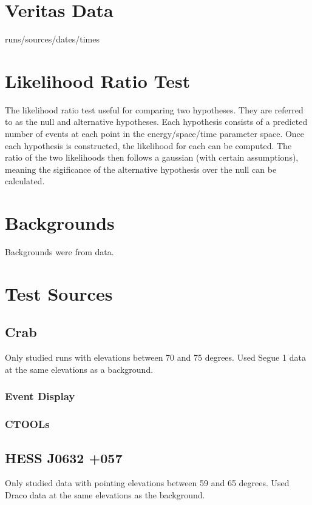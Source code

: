 \section{Veritas Data}
runs/sources/dates/times

\section{Likelihood Ratio Test}
The likelihood ratio test useful for comparing two hypotheses.
They are referred to as the null and alternative hypotheses.
Each hypothesis consists of a predicted number of events at each point in the energy/space/time parameter space.
Once each hypothesis is constructed, the likelihood for each can be computed.
The ratio of the two likelihoods then follows a gaussian (with certain assumptions), meaning the sigificance of the alternative hypothesis over the null can be calculated.

\section{Backgrounds}

Backgrounds were from data.

\section{Test Sources}

  \subsection{Crab}
    Only studied runs with elevations between 70 and 75 degrees.
    Used Segue 1 data at the same elevations as a background.

    \subsubsection{Event Display}
    \subsubsection{CTOOLs}

  \subsection{HESS J0632 +057}
    Only studied data with pointing elevations between 59 and 65 degrees.
    Used Draco data at the same elevations as the background.

